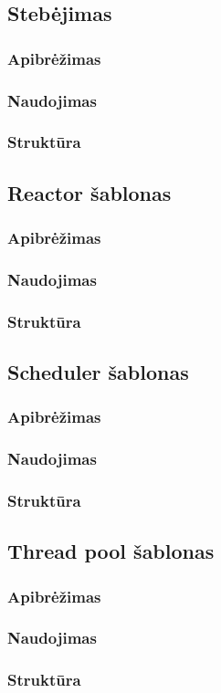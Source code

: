 \documentclass[10pt]{IEEEtran}
\begin{document}
		\subsection{Stebėjimas}

			\subsubsection{Apibrėžimas}

			\subsubsection{Naudojimas}

			\subsubsection{Struktūra}

		\subsection{Reactor šablonas}

			\subsubsection{Apibrėžimas}

			\subsubsection{Naudojimas}

			\subsubsection{Struktūra}

		\subsection{Scheduler šablonas}

			\subsubsection{Apibrėžimas}

			\subsubsection{Naudojimas}

			\subsubsection{Struktūra}

		\subsection{Thread pool šablonas}

			\subsubsection{Apibrėžimas}

			\subsubsection{Naudojimas}

			\subsubsection{Struktūra}
\end{document}
